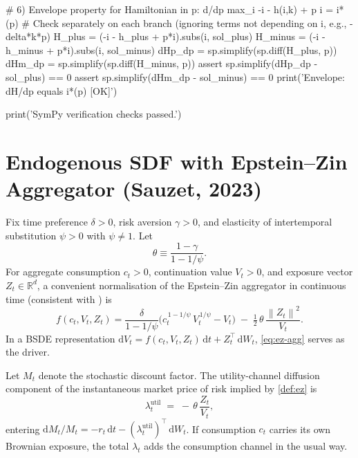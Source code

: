 \documentclass[11pt,letterpaper,oneside]{article}
\numberwithin{equation}{section}
\newcommand{\1}{\mathbf{1}}
\newcommand{\norm}[1]{\left\lVert #1\right\rVert}
\begin{document}
\begin{pyconsole}
# 6) Envelope property for Hamiltonian in p: d/dp max_i { -i - h(i,k) + p i } = i*(p)
#    Check separately on each branch (ignoring terms not depending on i, e.g., -delta*k*p)
H_plus  = (-i - h_plus + p*i).subs(i, sol_plus)
H_minus = (-i - h_minus + p*i).subs(i, sol_minus)
dHp_dp  = sp.simplify(sp.diff(H_plus, p))
dHm_dp  = sp.simplify(sp.diff(H_minus, p))
assert sp.simplify(dHp_dp - sol_plus) == 0
assert sp.simplify(dHm_dp - sol_minus) == 0
print('Envelope: dH/dp equals i*(p)       [OK]')

print('\nAll SymPy verification checks passed.')
\end{pyconsole}

\section{Endogenous SDF with Epstein--Zin Aggregator (Sauzet, 2023)}\label{sec:ez}

\begin{definition}\label{def:ez}
Fix time preference $\delta>0$, risk aversion $\gamma>0$, and elasticity of
intertemporal substitution $\psi>0$ with $\psi\neq 1$. Let
\[
\theta \equiv \frac{1-\gamma}{1-1/\psi}.
\]
For aggregate consumption $c_t>0$, continuation value $V_t>0$, and exposure
vector $Z_t\in\mathbb{R}^d$, a convenient normalisation of the Epstein--Zin
aggregator in continuous time (consistent with \cite{Sauzet2023}) is
\begin{equation}\label{eq:ez-agg}
f(c_t,V_t,Z_t)
= \frac{\delta}{1-1/\psi}\Big( c_t^{\,1-1/\psi}\,V_t^{\,1/\psi} - V_t \Big)
\; -\; \tfrac{1}{2}\,\theta\,\frac{\norm{Z_t}^2}{V_t}.
\end{equation}
In a BSDE representation $\mathrm{d}V_t = f(c_t,V_t,Z_t)\,\mathrm{d}t + Z_t^\top\,\mathrm{d}W_t$,
\eqref{eq:ez-agg} serves as the driver.
\end{definition}

\begin{proposition}\label{prop:sdf-ez}
Let $M_t$ denote the stochastic discount factor. The utility-channel diffusion
component of the instantaneous market price of risk implied by
\cref{def:ez} is
\[
\lambda^{\mathrm{util}}_t \;=\; -\,\theta\,\frac{Z_t}{V_t},
\]
entering $\mathrm{d}M_t/M_t = -r_t\,\mathrm{d}t - (\lambda^{\mathrm{util}}_t)^{\!\top}\,\mathrm{d}W_t$.
If consumption $c_t$ carries its own Brownian exposure, the total $\lambda_t$ adds
the consumption channel in the usual way.
\end{proposition}
\end{document}

